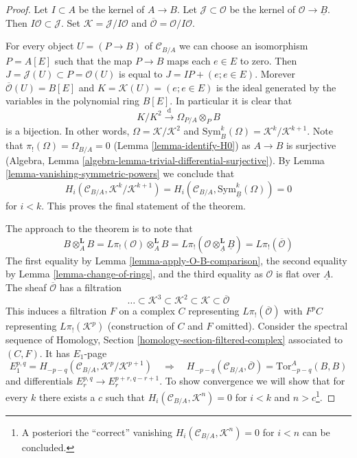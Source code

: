 \begin{proof}
Let $I \subset A$ be the kernel of $A \to B$. Let
$\mathcal{J} \subset \mathcal{O}$
be the kernel of $\mathcal{O} \to \underline{B}$. Then
$I\mathcal{O} \subset \mathcal{J}$. Set
$\mathcal{K} = \mathcal{J}/I\mathcal{O}$ and
$\overline{\mathcal{O}} = \mathcal{O}/I\mathcal{O}$.

\medskip\noindent
For every object $U = (P \to B)$ of $\mathcal{C}_{B/A}$
we can choose an isomorphism $P = A[E]$ such that the map
$P \to B$ maps each $e \in E$ to zero. Then
$J = \mathcal{J}(U) \subset P = \mathcal{O}(U)$
is equal to $J = IP + (e; e \in E)$. Morever
$\overline{\mathcal{O}}(U) = B[E]$ and $K = \mathcal{K}(U) = (e; e \in E)$
is the ideal generated by the variables in the polynomial ring $B[E]$.
In particular it is clear that
$$
K/K^2 \xrightarrow{\text{d}} \Omega_{P/A} \otimes_P B
$$
is a bijection. In other words, $\Omega = \mathcal{K}/\mathcal{K}^2$
and $\text{Sym}_B^k(\Omega) = \mathcal{K}^k/\mathcal{K}^{k + 1}$.
Note that $\pi_!(\Omega) = \Omega_{B/A} = 0$ (Lemma \ref{lemma-identify-H0})
as $A \to B$ is surjective
(Algebra, Lemma \ref{algebra-lemma-trivial-differential-surjective}).
By Lemma \ref{lemma-vanishing-symmetric-powers} we conclude that
$$
H_i(\mathcal{C}_{B/A}, \mathcal{K}^k/\mathcal{K}^{k + 1}) =
H_i(\mathcal{C}_{B/A}, \text{Sym}^k_{\underline{B}}(\Omega)) = 0
$$
for $i < k$. This proves the final statement of the theorem.

\medskip\noindent
The approach to the theorem is to note that
$$
B \otimes_A^\mathbf{L} B = L\pi_!(\mathcal{O}) \otimes_A^\mathbf{L} B =
L\pi_!(\mathcal{O} \otimes_{\underline{A}}^\mathbf{L} \underline{B}) =
L\pi_!(\overline{\mathcal{O}})
$$
The first equality by Lemma \ref{lemma-apply-O-B-comparison},
the second equality by Lemma \ref{lemma-change-of-rings}, and
the third equality as $\mathcal{O}$ is flat over $\underline{A}$.
The sheaf $\overline{\mathcal{O}}$ has a filtration
$$
\ldots \subset
\mathcal{K}^3 \subset
\mathcal{K}^2 \subset
\mathcal{K} \subset
\overline{\mathcal{O}}
$$
This induces a filtration $F$ on a complex $C$ representing
$L\pi_!(\overline{\mathcal{O}})$ with $F^pC$ representing
$L\pi_!(\mathcal{K}^p)$ (construction of $C$ and $F$ omitted).
Consider the spectral sequence of
Homology, Section \ref{homology-section-filtered-complex}
associated to $(C, F)$. It has $E_1$-page
$$
E_1^{p, q} = H_{- p - q}(\mathcal{C}_{B/A}, \mathcal{K}^p/\mathcal{K}^{p + 1})
\quad\Rightarrow\quad
H_{- p - q}(\mathcal{C}_{B/A}, \overline{\mathcal{O}}) = 
\text{Tor}_{- p - q}^A(B, B)
$$
and differentials $E_r^{p, q} \to E_r^{p + r, q - r + 1}$. To show convergence
we will show that for every $k$ there exists a $c$ such that
$H_i(\mathcal{C}_{B/A}, \mathcal{K}^n) = 0$
for $i < k$ and $n > c$\footnote{A posteriori
the ``correct'' vanishing $H_i(\mathcal{C}_{B/A}, \mathcal{K}^n) = 0$ for
$i < n$ can be concluded.}.


\end{proof}
